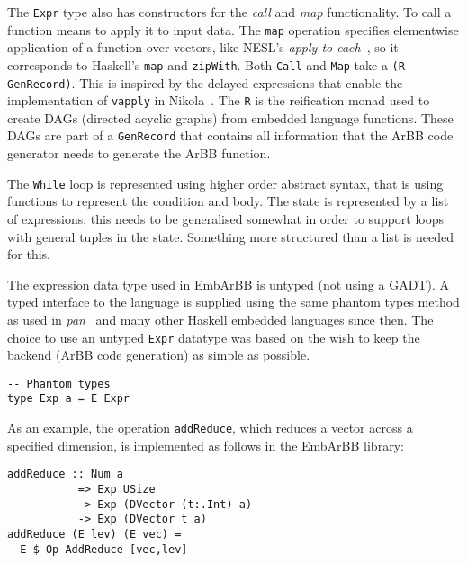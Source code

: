 The {\tt Expr} type also has constructors for the {\em call} and {\em map} 
functionality. To call a function means to apply it to input data. The 
{\tt map} operation specifies elementwise application of a function over 
vectors, like NESL's {\em apply-to-each}~\cite{NESL}, so it corresponds 
to Haskell's {\tt map} and {\tt zipWith}. Both {\tt Call} and {\tt Map} 
take a {\tt(R GenRecord)}. This is inspired by the delayed expressions 
that enable the implementation of {\tt vapply} in Nikola~\cite{NIKOLA}. 
The {\tt R} is the reification monad used to create DAGs (directed acyclic 
graphs) from embedded language functions. These DAGs are part of a 
{\tt GenRecord} that contains all information that the ArBB code generator 
needs to generate the ArBB function. 

The {\tt While} loop is represented using higher order abstract syntax, 
that is using functions to represent the condition and body. The state 
is represented by a list of expressions; this needs to be generalised 
somewhat in order to support loops with general tuples in the state. 
Something more structured than a list is needed for this. 

The expression data type used in EmbArBB is untyped (not using a GADT). 
A typed interface to the language is supplied using the same phantom types 
method as used in {\em pan}~\cite{ELLIJFP} and many other Haskell embedded 
languages since then. The choice to use an untyped {\tt Expr} datatype was 
based on the wish to keep the backend (ArBB code generation) as simple as 
possible. 


\begin{verbatim}
-- Phantom types
type Exp a = E Expr 
\end{verbatim}  

As an example, the operation {\tt addReduce}, which reduces a vector across a specified dimension, is implemented as follows in the EmbArBB library:

\begin{verbatim}
addReduce :: Num a 
           => Exp USize 
           -> Exp (DVector (t:.Int) a) 
           -> Exp (DVector t a) 
addReduce (E lev) (E vec) = 
  E $ Op AddReduce [vec,lev]
\end{verbatim}  

